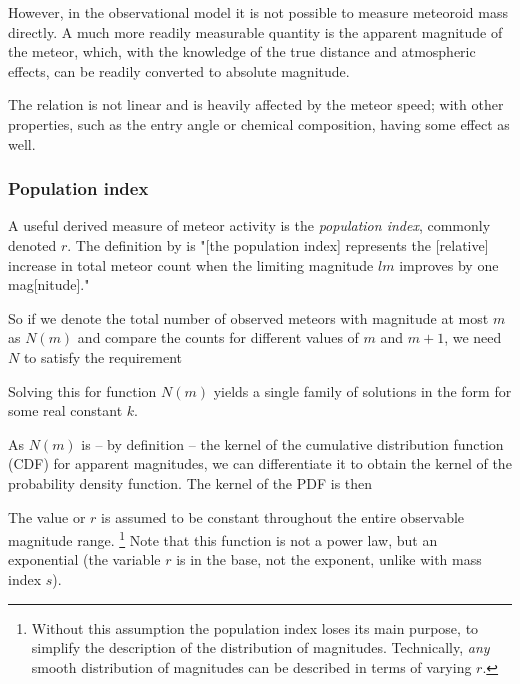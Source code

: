             However, in the observational model it is not possible to measure meteoroid mass directly.
            A much more readily measurable quantity is the apparent magnitude of the meteor, which,
            with the knowledge of the true distance and atmospheric effects, can be readily converted
            to absolute magnitude.

            The relation is not linear and is heavily affected by the meteor speed; with other properties,
            such as the entry angle or chemical composition, having some effect as well.

        \subsubsection{Population index} \label{msar}
            A useful derived measure of meteor activity is the \emph{population index}, commonly denoted $r$.
            The definition by \citet{molau2015} is "[the population index] represents the [relative] increase
            in total meteor count when the limiting magnitude $lm$ improves by one mag[nitude]."

            So if we denote the total number of observed meteors with magnitude at most $m$ as $N(m)$
            and compare the counts for different values of $m$ and $m + 1$, we need $N$ to satisfy the requirement

            Solving this for function $N(m)$ yields a single family of solutions
            in the form
            for some real constant $k$.

            As $N(m)$ is -- by definition -- the kernel of the
            cumulative distribution function (CDF) for apparent magnitudes, we can differentiate it
            to obtain the kernel of the probability density function. The kernel of the PDF is then

            The value or $r$ is assumed to be constant throughout the entire observable magnitude range.%
            \footnote{Without this assumption the population index loses its main purpose,
            to simplify the description of the distribution of magnitudes.
            Technically, \emph{any} smooth distribution of magnitudes can be described in terms of varying $r$.}
            Note that this function is not a power law, but an exponential (the variable $r$
            is in the base, not the exponent, unlike with mass index $s$).

